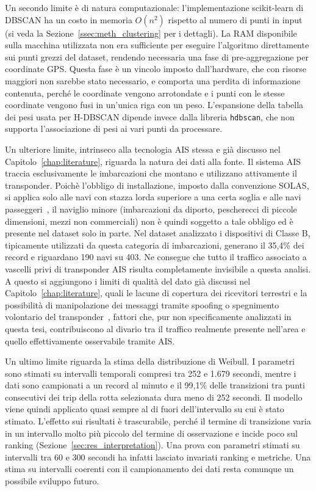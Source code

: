 Un secondo limite è di natura computazionale: l'implementazione scikit-learn di DBSCAN ha
un costo in memoria $O(n^2)$ rispetto al numero di punti in input (si veda la
Sezione~\ref{ssec:meth_clustering} per i dettagli). La RAM disponibile sulla macchina
utilizzata non era sufficiente per eseguire l'algoritmo direttamente sui punti grezzi del
dataset, rendendo necessaria una fase di pre-aggregazione per coordinate GPS. Questa fase è un vincolo
imposto dall'hardware, che con risorse maggiori non sarebbe stato necessario, e comporta una
perdita di informazione contenuta, perché le coordinate vengono arrotondate e i punti con le
stesse coordinate vengono fusi in un'unica riga con un peso. L'espansione della tabella dei pesi
usata per H-DBSCAN dipende invece dalla libreria \texttt{hdbscan}, che non supporta l'associazione di pesi
ai vari punti da processare.

Un ulteriore limite, intrinseco alla tecnologia AIS stessa e già discusso nel
Capitolo~\ref{chap:literature}, riguarda la natura dei dati alla fonte. Il sistema AIS
traccia esclusivamente le imbarcazioni che montano e utilizzano attivamente il
transponder. Poichè l'obbligo di installazione, imposto dalla convenzione SOLAS, si applica
solo alle navi con stazza lorda superiore a una certa soglia e alle navi passeggeri~\cite{imo2004}, 
il naviglio minore (imbarcazioni da diporto, pescherecci di piccole dimensioni, mezzi non commerciali) 
non è quindi soggetto a tale obbligo ed è presente nel dataset solo in parte. 
Nel dataset analizzato i dispositivi di Classe B, tipicamente utilizzati
da questa categoria di imbarcazioni, generano il 35,4\% dei record e riguardano 190 navi su 403. 
Ne consegue che tutto il traffico associato a vascelli privi di transponder AIS risulta completamente
invisibile a questa analisi.
A questo si aggiungono i limiti di qualità del dato già discussi nel
Capitolo~\ref{chap:literature}, quali le lacune di copertura dei ricevitori terrestri e
la possibilità di manipolazione dei messaggi tramite spoofing o spegnimento volontario
del transponder~\cite{riassuntone}, fattori che, pur non specificamente analizzati in
questa tesi, contribuiscono al divario tra il traffico realmente presente nell'area e
quello effettivamente osservabile tramite AIS\@.

Un ultimo limite riguarda la stima della distribuzione di Weibull. I parametri sono stimati su intervalli
temporali compresi tra 252 e 1.679 secondi, mentre i dati sono campionati a un record al minuto e il 99,1\%
delle transizioni tra punti consecutivi dei trip della rotta selezionata dura meno di 252 secondi.
Il modello viene quindi applicato quasi sempre al di fuori dell'intervallo su cui è stato stimato.
L'effetto sui risultati è trascurabile, perché il termine di transizione varia in un
intervallo molto più piccolo del termine di osservazione e incide poco sul ranking
(Sezione~\ref{sec:res_interpretation}). Una prova con parametri stimati su intervalli tra 60 e 300 secondi
ha infatti lasciato invariati ranking e metriche. Una stima su intervalli coerenti con il campionamento dei
dati resta comunque un possibile sviluppo futuro.


